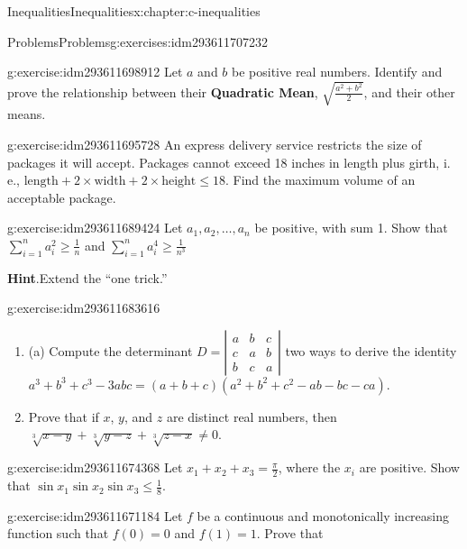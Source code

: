 \documentclass[twoside,10pt,]{book}
\newcommand{\blocktitlefont}{\relax}
\newcommand{\terminology}[1]{\textbf{#1}}
\numberwithin{equation}{section}
\begin{document}
\begin{chapterptx}{Inequalities}{}{Inequalities}{}{}{x:chapter:c-inequalities}
\begin{exercises-section}{Problems}{}{Problems}{}{}{g:exercises:idm293611707232}
\begin{divisionexercise}{3}{}{}{g:exercise:idm293611698912}
Let \(a\) and \(b\) be positive real numbers. Identify and prove the relationship between their \terminology{Quadratic Mean}, \(\sqrt{\frac{a^2 + b^2}{2}}\), and their other means.%
\end{divisionexercise}%
\begin{divisionexercise}{4}{}{}{g:exercise:idm293611695728}%
An express delivery service restricts the size of packages it will accept.  Packages cannot exceed 18 inches in length plus girth, i. e., \(\text{length}+2\times\text{width} +2\times \text{height}\leq 18\).  Find the maximum volume of an acceptable package.%
\end{divisionexercise}%
\begin{divisionexercise}{5}{}{}{g:exercise:idm293611689424}%
Let \(a_1, a_2, \ldots, a_{n }\) be positive, with sum 1.    Show that \(\sum _{i=1}^n a_i^2\geq \frac{1}{n}\)  and   \(\sum _{i=1}^n
a_i^4\geq \frac{1}{n^3}\)%
\par\smallskip%
\noindent\textbf{\blocktitlefont Hint}.\label{g:hint:idm293611687120}{}\hypertarget{g:hint:idm293611687120}{}\quad{}Extend the ``one trick.''%
\end{divisionexercise}%
\begin{divisionexercise}{6}{}{}{g:exercise:idm293611683616}%
%
\begin{enumerate}[label=(\alph*)]
\item{}(a)  Compute the determinant \(D= \left| 
\begin{array}{ccc}
a & b & c \\
c & a & b \\
b & c & a 
\end{array} \right|\) two ways to derive the identity \(a^3+b^3+c^3-3 a b c =(a+b+c) \left(a^2+b^2+c^2-a b-b c - c a\right)\).%
\item{}Prove that if \(x\), \(y\), and \(z\) are distinct real numbers, then \(\sqrt[3]{x-y}+ \sqrt[3]{y-z}+\sqrt[3]{z-x}\neq 0\).%
\end{enumerate}
\end{divisionexercise}%
\begin{divisionexercise}{7}{}{}{g:exercise:idm293611674368}%
Let \(x_1+x_2+x_3=\frac{\pi }{2}\), where the \(x_i\) are positive.   Show that  \(\sin  x_1\sin  x_2 \sin  x_3\leq \frac{1}{8}\).%
\end{divisionexercise}%
\begin{divisionexercise}{8}{}{}{g:exercise:idm293611671184}%
Let \(f\) be a continuous and monotonically increasing function such that \(f(0) = 0\) and \(f(1) = 1\). Prove that%

\end{divisionexercise}
\end{exercises-section}
\end{chapterptx}
\end{document}
